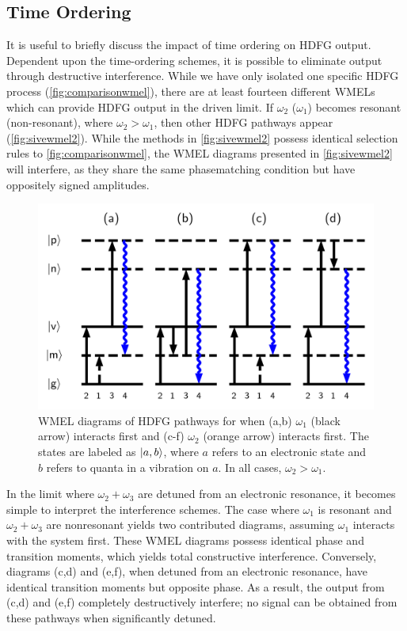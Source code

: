 \documentclass[aip, jcp, reprint, twocolumn]{revtex4-2}
\begin{document}
\subsection{Time Ordering}
It is useful to briefly discuss the impact of time ordering on HDFG output.
Dependent upon the time-ordering schemes, it is possible to eliminate output through destructive interference.
While we have only isolated one specific HDFG process (\autoref{fig:comparisonwmel}), there are at least fourteen different WMELs which can provide HDFG output in the driven limit. \cite{RN352}
If $\omega_2$ ($\omega_1$) becomes resonant (non-resonant), where $\omega_2 > \omega_1$, then other HDFG pathways appear (\autoref{fig:sivewmel2}).\cite{McDonnell2024} 
While the methods in \autoref{fig:sivewmel2} possess identical selection rules to \autoref{fig:comparisonwmel}, the WMEL diagrams presented in \autoref{fig:sivewmel2} will interfere, as they share the same phasematching condition but have oppositely signed amplitudes.
\begin{figure}[!htbp]
	\centering
	\includegraphics[width=6.66 in]{figures/timeorderedwmel.png}
	\caption{WMEL diagrams of HDFG pathways for when (a,b) $\omega_1$ (black arrow) interacts first and (c-f) $\omega_2$ (orange arrow) interacts first. 
		The states are labeled as $\ket{a,b}$, where $a$ refers to an electronic state and $b$ refers to quanta in a vibration on $a$.
		In all cases, $\omega_2 > \omega_1$.
	}
	\label{fig:sivewmel2}
\end{figure}

In the limit where $\omega_2+\omega_3$ are detuned from an electronic resonance, it becomes simple to interpret the interference schemes. 
The case where $\omega_1$ is resonant and $\omega_2 + \omega_3$ are nonresonant yields two contributed diagrams, assuming $\omega_1$ interacts with the system first.
These WMEL diagrams possess identical phase and transition moments, which yields total constructive interference.
Conversely, diagrams (c,d) and (e,f), when detuned from an electronic resonance, have identical transition moments but opposite phase. 
As a result, the output from (c,d) and (e,f) completely destructively interfere; no signal can be obtained from these pathways when significantly detuned. \cite{RN287, McDonnell2024}
\end{document}
